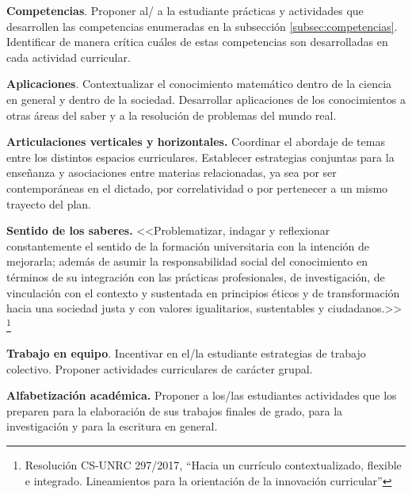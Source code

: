 \documentclass[a4paper, 12pt]{article}
\begin{document}
\begin{description}
  



\item{\textbf{Competencias}.} Proponer al/ a la estudiante prácticas y actividades que desarrollen las competencias enumeradas en la subsección \ref{subsec:competencias}. Identificar de manera crítica cuáles de estas competencias son desarrolladas en cada actividad curricular.


\item{\textbf{Aplicaciones}.}  Contextualizar el conocimiento matemático dentro de la ciencia en general y dentro de la sociedad. Desarrollar aplicaciones de los conocimientos a otras áreas del saber y a la resolución de problemas del mundo real. 



\item{\textbf{Articulaciones verticales y horizontales.}} Coordinar el abordaje de  temas entre los distintos espacios curriculares. Establecer estrategias conjuntas para la enseñanza y asociaciones entre materias relacionadas, ya sea por ser contemporáneas en el dictado, por correlatividad o por pertenecer a un mismo trayecto del plan. 


\item{ \textbf{Sentido de los saberes.}} <<Problematizar, indagar y reflexionar constantemente el sentido de la formación
universitaria con la intención de mejorarla; además de asumir la responsabilidad social del
conocimiento en términos de su integración con las prácticas profesionales, de investigación, de
vinculación con el contexto y sustentada en principios éticos y de transformación hacia una
sociedad justa y con valores igualitarios, sustentables y ciudadanos.>> \footnote{Resolución CS-UNRC 297/2017, ``Hacia   un   currículo contextualizado, flexible e integrado. Lineamientos para la orientación de la innovación  curricular''}

\item{\textbf{Trabajo en equipo}.} Incentivar en el/la estudiante estrategias de trabajo colectivo. Proponer actividades curriculares   de carácter  grupal.



\item{ \textbf{Alfabetización académica.}} Proponer a los/las estudiantes actividades que los preparen para la
elaboración de sus trabajos finales de grado, para la investigación y para la escritura en general. 





\end{description}
\end{document}
